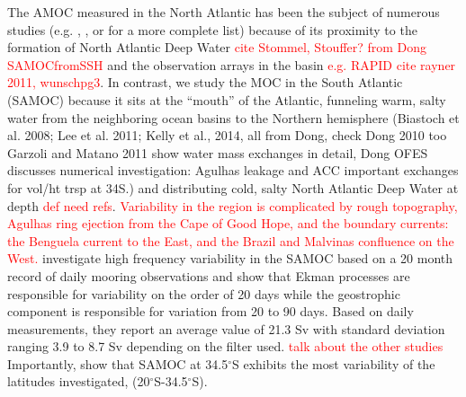 \documentclass[a4paper,11pt]{article}
\newcommand{\red}[1]{\textcolor{red}{#1}}
\begin{document}
	The AMOC measured in the North Atlantic has been the subject of numerous studies (e.g. \cite{mccarthyAmoc}, \cite{pillarAttribution}, or \cite{lozierOverturning} for a more complete list) because of its proximity to the formation of North Atlantic Deep Water \red{cite Stommel, Stouffer? from Dong SAMOCfromSSH} and the observation arrays in the basin \red{e.g. RAPID cite rayner 2011, wunschpg3}. In contrast, we study the MOC in the South Atlantic (SAMOC) because it sits at the ``mouth'' of the Atlantic, funneling warm, salty water from the neighboring ocean basins to the Northern hemisphere (Biastoch et al. 2008; Lee et al. 2011; Kelly et al., 2014, all from Dong, check Dong 2010 too Garzoli and Matano 2011 show water mass exchanges in detail, Dong OFES discusses numerical investigation: Agulhas leakage and ACC important exchanges for vol/ht trsp at 34S.) and distributing cold, salty North Atlantic Deep Water at depth \red{def need refs}. \red{Variability in the region is complicated by rough topography, Agulhas ring ejection from the Cape of Good Hope, and the boundary currents: the Benguela current to the East, and the Brazil and Malvinas confluence on the West.} \cite{meinenSamoc} investigate high frequency variability in the SAMOC based on a 20 month record of daily mooring observations and show that Ekman processes are responsible for variability on the order of 20 days while the geostrophic component is responsible for variation from 20 to 90 days. Based on daily measurements, they report an average value of 21.3 Sv with standard deviation ranging 3.9 to 8.7 Sv depending on the filter used. \red{talk about the other studies} Importantly, \cite{dong20to35} show that SAMOC at 34.5$^{\circ}$S exhibits the most variability of the latitudes investigated, (20$^{\circ}$S-34.5$^{\circ}$S).
\end{document}
